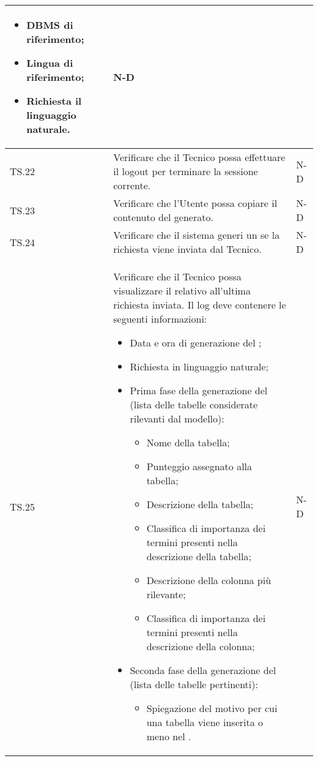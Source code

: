 \begin{adjustwidth}{-0.5cm}{-0.5cm}
\begin{longtable}{|P{1.5cm}|>{\raggedright}P{9.5cm}|>{\arraybackslash}P{1.5cm}|}
\begin{itemize}
\begin{itemize}
			\end{itemize}
			\item DBMS di riferimento;
			\item Lingua di riferimento;
			\item Richiesta il linguaggio naturale.
		\end{itemize} & N-D \\
		\hline TS.22 & Verificare che il Tecnico possa effettuare il logout per terminare la sessione corrente. & N-D \\ 
		\hline TS.23 & Verificare che l'Utente possa copiare il contenuto del  generato. & N-D \\ 
		\hline TS.24 & Verificare che il sistema generi un  se la richiesta viene inviata dal Tecnico. & N-D \\ 
		\hline TS.25 & Verificare che il Tecnico possa visualizzare il  relativo all'ultima richiesta inviata. Il log deve contenere le seguenti informazioni:
    \begin{itemize}
      \item Data e ora di generazione del ;
      \item Richiesta in linguaggio naturale;
      \item Prima fase della generazione del  (lista delle tabelle considerate rilevanti dal modello):
      \begin{itemize}
        \item Nome della tabella;
        \item Punteggio assegnato alla tabella;
        \item Descrizione della tabella;
        \item Classifica di importanza dei termini presenti nella descrizione della tabella;
        \item Descrizione della colonna più rilevante;
        \item Classifica di importanza dei termini presenti nella descrizione della colonna;
      \end{itemize}
      \item Seconda fase della generazione del  (lista delle tabelle pertinenti):
      \begin{itemize}
        \item Spiegazione del motivo per cui una tabella viene inserita o meno nel .
      \end{itemize}
    \end{itemize} & N-D \\ 

\end{longtable}
\end{adjustwidth}

